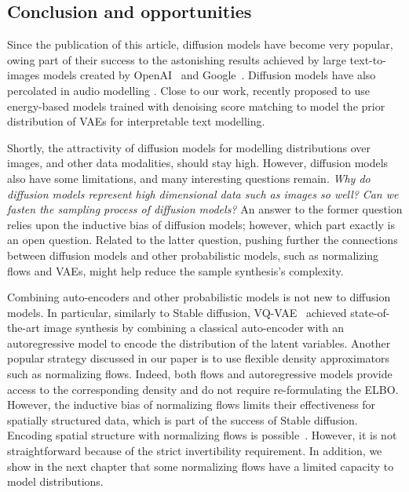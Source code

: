 \subsection{Conclusion and opportunities}
Since the publication of this article, diffusion models have become very popular, owing part of their success to the astonishing results achieved by large text-to-images models created by OpenAI~\citep[$\text{DALL}\cdot\text{E } 2$][]{ramesh2022hierarchical} and Google~\citep[Imagen][]{saharia2022photorealistic}. Diffusion models have also percolated in audio modelling \citep{kong2020diffwave}. Close to our work, \citet{yu2022latent} recently proposed to use energy-based models trained with denoising score matching to model the prior distribution of VAEs for interpretable text modelling.

Shortly, the attractivity of diffusion models for modelling distributions over images, and other data modalities, should stay high. However, diffusion models also have some limitations, and many interesting questions remain. \textit{Why do diffusion models represent high dimensional data such as images so well?} \textit{Can we fasten the sampling process of diffusion models?}
 An answer to the former question relies upon the inductive bias of diffusion models; however, which part exactly is an open question. Related to the latter question, pushing further the connections between diffusion models and other probabilistic models, such as normalizing flows and VAEs, might help reduce the sample synthesis's complexity.

 Combining auto-encoders and other probabilistic models is not new to diffusion models. In particular, similarly to Stable diffusion, VQ-VAE~\citep{razavi2019generating, razavi2019generating2} achieved state-of-the-art image synthesis by combining a classical auto-encoder with an autoregressive model to encode the distribution of the latent variables. Another popular strategy discussed in our paper is to use flexible density approximators such as normalizing flows. Indeed, both flows and autoregressive models provide access to the corresponding density and do not require re-formulating the ELBO. However, the inductive bias of normalizing flows limits their effectiveness for spatially structured data, which is part of the success of Stable diffusion. Encoding spatial structure with normalizing flows is possible~\citep{kingma_glow_2018}. However, it is not straightforward because of the strict invertibility requirement. In addition, we show in the next chapter that some normalizing flows have a limited capacity to model distributions.

